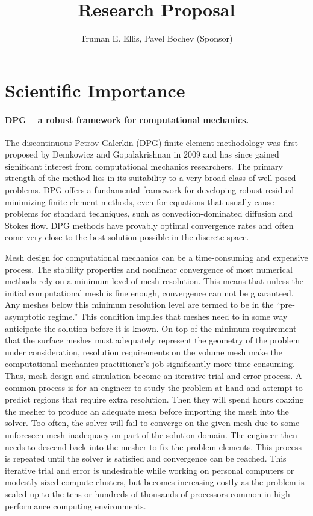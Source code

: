 \documentclass[letterpaper,12pt]{article}
\title{Research Proposal}
\author{Truman E. Ellis, Pavel Bochev (Sponsor)}
\date{}
\begin{document}
\maketitle

\section*{Scientific Importance}
\paragraph{DPG -- a robust framework for computational mechanics.}
The discontinuous Petrov-Galerkin (DPG) finite element methodology was first proposed by Demkowicz and Gopalakrishnan \cite{DPG1,DPG2} 
in 2009 and has since gained significant interest from computational mechanics researchers.
The primary strength of the method lies in its suitability to a very broad class of well-posed problems.
DPG offers a fundamental framework for developing robust residual-minimizing finite element methods, even for equations that usually cause problems
for standard techniques, such as convection-dominated diffusion and Stokes flow.
DPG methods have provably optimal convergence rates and often come very close to the best solution possible in the discrete space.

Mesh design for computational mechanics can be a time-consuming and expensive process.
The stability properties and nonlinear convergence of most numerical methods rely on a minimum level of mesh resolution. 
This means that unless the initial computational mesh is fine enough, convergence can not be guaranteed. 
Any meshes below this minimum resolution level are termed to be in the ``pre-asymptotic regime.'' 
This condition implies that meshes need to in some way anticipate the solution before it is known. 
On top of the minimum requirement that the surface meshes must adequately represent the geometry of the problem under consideration, 
resolution requirements on the volume mesh make the computational mechanics practitioner's job significantly more time consuming. 
Thus, mesh design and simulation become an iterative trial and error process.
A common process is for an engineer to study the problem at hand and attempt to predict regions that require extra resolution. 
Then they will spend hours coaxing the mesher to produce an adequate mesh before importing the mesh into the solver.
Too often, the solver will fail to converge on the given mesh due to some unforeseen mesh inadequacy on part of the solution domain.
The engineer then needs to descend back into the mesher to fix the problem elements.
This process is repeated until the solver is satisfied and convergence can be reached.
This iterative trial and error is undesirable while working on personal computers or modestly sized compute clusters, 
but becomes increasing costly as the problem is scaled up to the tens or hundreds of thousands of processors common in high performance computing environments.
\end{document}
